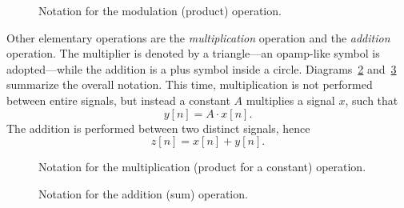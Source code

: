 \documentclass[\documentfontsize, twocolumn]{\classname}
\begin{document}
\begin{figure}[ht]
\begin{center}
    \caption{Notation for the modulation (product) operation.}\label{tikz:modulation-operation}
\end{center}
\end{figure}

Other elementary operations are the \emph{multiplication} operation and the \emph{addition} operation. The multiplier is denoted by a triangle---an opamp-like symbol is adopted---while the addition is a plus symbol inside a circle. Diagrams~\ref{tikz:multiplication-operation} and~\ref{tikz:addition-operation} summarize the overall notation. This time, multiplication is not performed between entire signals, but instead a constant $A$ multiplies a signal $x$, such that $$y[n] = A \cdot x[n].$$ The addition is performed between two distinct signals, hence $$z[n] = x[n] + y[n].$$

\begin{figure}[ht]
\begin{center}
    \caption{Notation for the multiplication (product for a constant) operation.}\label{tikz:multiplication-operation}
\end{center}
\end{figure}

\begin{figure}[ht]
\begin{center}
\caption{Notation for the addition (sum) operation.}\label{tikz:addition-operation}
\end{center}
\end{figure}
\end{document}
